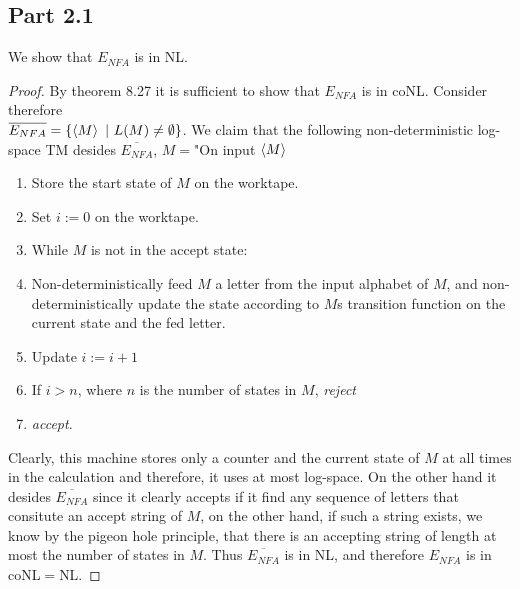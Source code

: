 \documentclass[a4paper,11pt]{article}
\newcommand{\pipe}{\ \vert \ }
\numberwithin{equation}{section}
\begin{document}
	\subsection*{Part 2.1}
	We show that $ E_{NFA} $ is in NL. \begin{proof}
		By theorem 8.27 it is sufficient to show that $ E_{NFA} $ is in coNL. Consider therefore\\ $ \overline{E_{NFA}}=\{\braket{M}\pipe L(M)\neq \emptyset\} $. We claim that the following non-deterministic log-space TM desides $ \overline{E_{NFA}} $, $ M= $"On input $ \braket{M} $\begin{enumerate}
			\item Store the start state of $ M $ on the worktape.
			\item Set $ i:=0 $ on the worktape.
			\item While $ M $ is not in the accept state:
			\item \begin{addmargin}[2em]{0em}
				Non-deterministically feed $ M $ a letter from the input alphabet of $ M $, and non-deterministically update the state according to $ M $s transition function on the current state and the fed letter.
			\end{addmargin} 
			\item \qquad Update $ i:=i+1 $
			\item \qquad If $ i>n $, where $ n $ is the number of states in $ M $, \emph{reject}
			\item \emph{accept}.
		\end{enumerate}
		Clearly, this machine stores only a counter and the current state of $ M $ at all times in the calculation and therefore, it uses at most log-space. On the other hand it desides $ \overline{E_{NFA}} $ since it clearly accepts if it find any sequence of letters that consitute an accept string of $ M $, on the other hand, if such a string exists, we know by the pigeon hole principle, that there is an accepting string of length at most the number of states in $ M $. Thus  $ \overline{E_{NFA}} $  is in NL, and therefore $ E_{NFA} $ is in coNL$ = $NL.
	\end{proof}
\end{document}
